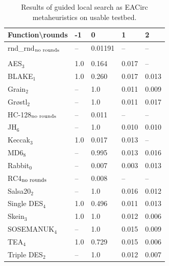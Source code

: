 \documentclass[
    digital,    %
    oneside,    %
    color,
    11pt,
    nocover,
    notable,
    nolof,
    nolot,
]{fithesis3}
\newcommand{\fd}{\cellcolor{myred!15}}
\newcommand{\fn}{\cellcolor{mygreen!20}}
\begin{document}
\begin{table}[H]
\centering
\begin{tabular}{l|l l l l}
\textbf{\large Function\textbackslash{}rounds} & \textbf{\large -1} & \textbf{\large 0} & \textbf{\large 1} & \textbf{\large 2}\\ \hline
rnd\_rnd$_{\textnormal{no rounds}}$ & -- & \fn{}0.01191& --  & --   \\\\
AES$_{3}$        & \fd{}1.0   & \fd{}0.164 & \fn{}0.017 & \fn{}--   \\
BLAKE$_{1}$      & \fd{}1.0   & \fd{}0.260 & \fn{}0.017 & \fn{}0.013\\
Grain$_{2}$      & \fd{}--    & \fd{}1.0   & \fn{}0.011 & \fn{}0.009\\
Gr\o stl$_{2}$   & \fd{}--    & \fd{}1.0   & \fn{}0.011 & \fn{}0.017\\
HC-128$_{\textnormal{no rounds}}$& -- & \fn{}0.011 & -- & --        \\
JH$_{6}$         & \fd{}--    & \fd{}1.0   & \fn{}0.010 & \fn{}0.010\\
Keccak$_{3}$     & \fd{}1.0   & \fn{}0.017 & \fn{}0.013 & \fn{}--   \\
MD6$_{8}$        & \fd{}--    & \fd{}0.995 & \fn{}0.013 & \fn{}0.016\\
Rabbit$_{0}$     &      --    & \fn{}0.007 & \fn{}0.003 & \fn{}0.013\\
RC4$_{\textnormal{no rounds}}$& -- & \fn{}0.008 & --    & --        \\
Salsa20$_{2}$    & \fd{}--    & \fd{}1.0   & \fn{}0.016 & \fn{}0.012\\
Single DES$_{4}$ & \fd{}1.0   & \fd{}0.496 & \fn{}0.011 & \fn{}0.013\\
Skein$_{3}$      & \fd{}1.0   & \fd{}1.0   & \fn{}0.012 & \fn{}0.006\\
SOSEMANUK$_{4}$  & \fd{}--    & \fd{}1.0   & \fn{}0.015 & \fn{}0.009\\
TEA$_{4}$        & \fd{}1.0   & \fd{}0.729 & \fn{}0.015 & \fn{}0.006\\
Triple DES$_{2}$ & \fd{}--    & \fd{}1.0   & \fn{}0.012 & \fn{}0.007
\end{tabular}
\caption{Results of guided local search as EACirc metaheuristics on usable testbed.}
\label{table:res-usable-gls}
\end{table}
\end{document}
